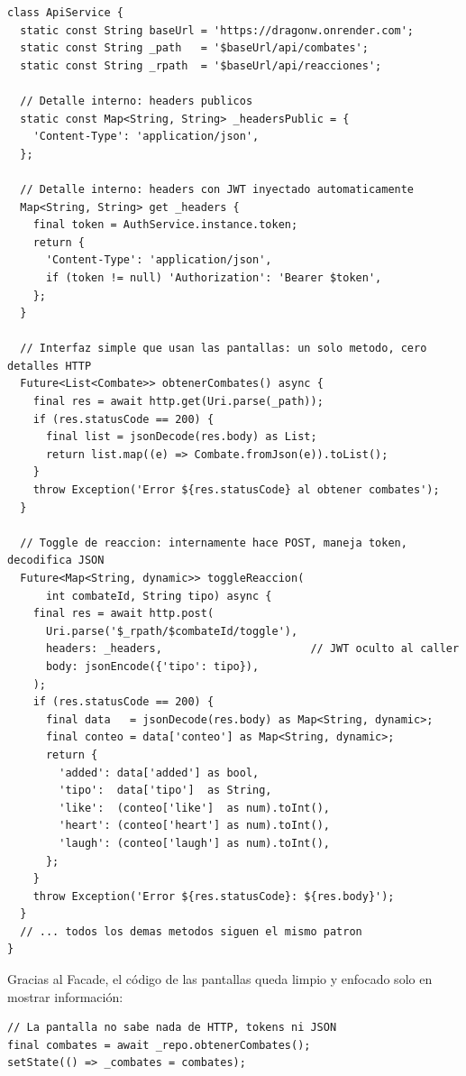 \documentclass{article}
\begin{document}
\begin{lstlisting}[style=dartStyle, caption={ApiService -- Facade sobre HTTP (lib/services/api\_service.dart)}]
class ApiService {
  static const String baseUrl = 'https://dragonw.onrender.com';
  static const String _path   = '$baseUrl/api/combates';
  static const String _rpath  = '$baseUrl/api/reacciones';
 
  // Detalle interno: headers publicos
  static const Map<String, String> _headersPublic = {
    'Content-Type': 'application/json',
  };
 
  // Detalle interno: headers con JWT inyectado automaticamente
  Map<String, String> get _headers {
    final token = AuthService.instance.token;
    return {
      'Content-Type': 'application/json',
      if (token != null) 'Authorization': 'Bearer $token',
    };
  }
 
  // Interfaz simple que usan las pantallas: un solo metodo, cero detalles HTTP
  Future<List<Combate>> obtenerCombates() async {
    final res = await http.get(Uri.parse(_path));
    if (res.statusCode == 200) {
      final list = jsonDecode(res.body) as List;
      return list.map((e) => Combate.fromJson(e)).toList();
    }
    throw Exception('Error ${res.statusCode} al obtener combates');
  }
 
  // Toggle de reaccion: internamente hace POST, maneja token, decodifica JSON
  Future<Map<String, dynamic>> toggleReaccion(
      int combateId, String tipo) async {
    final res = await http.post(
      Uri.parse('$_rpath/$combateId/toggle'),
      headers: _headers,                       // JWT oculto al caller
      body: jsonEncode({'tipo': tipo}),
    );
    if (res.statusCode == 200) {
      final data   = jsonDecode(res.body) as Map<String, dynamic>;
      final conteo = data['conteo'] as Map<String, dynamic>;
      return {
        'added': data['added'] as bool,
        'tipo':  data['tipo']  as String,
        'like':  (conteo['like']  as num).toInt(),
        'heart': (conteo['heart'] as num).toInt(),
        'laugh': (conteo['laugh'] as num).toInt(),
      };
    }
    throw Exception('Error ${res.statusCode}: ${res.body}');
  }
  // ... todos los demas metodos siguen el mismo patron
}
\end{lstlisting}
 
Gracias al Facade, el c\'odigo de las pantallas queda limpio y enfocado solo
en mostrar informaci\'on:
 
\begin{lstlisting}[style=dartStyle, caption={Uso del Facade desde una pantalla (fragmento de home\_screen.dart)}]
// La pantalla no sabe nada de HTTP, tokens ni JSON
final combates = await _repo.obtenerCombates();
setState(() => _combates = combates);
\end{lstlisting}
 
\end{document}
